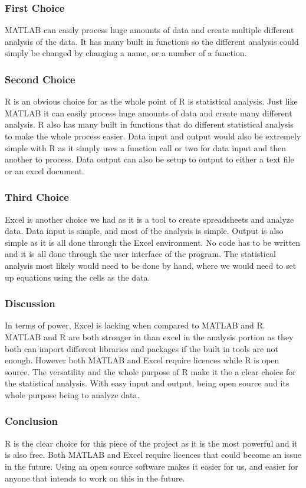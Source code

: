 	\subsubsection*{First Choice}
	MATLAB can easily process huge amounts of data and create multiple different analysis of the data. It has many built in functions so the different analysis could simply be changed by changing a name, or a number of a function. 
	\subsubsection*{Second Choice}
	R is an obvious choice for as the whole point of R is statistical analysis. Just like MATLAB it can easily process huge amounts of data and create many different analysis. R also has many built in functions that do different statistical analysis to make the whole process easier. Data input and output would also be extremely simple with R as it simply uses a function call or two for data input and then another to process. Data output can also be setup to output to either a text file or an excel document.
	\subsubsection*{Third Choice}
	Excel is another choice we had as it is a tool to create spreadsheets and analyze data. Data input is simple, and most of the analysis is simple. Output is also simple as it is all done through the Excel environment. No code has to be written and it is all done through the user interface of the program. The statistical analysis most likely would need to be done by hand, where we would need to set up equations using the cells as the data.
	\subsubsection*{Discussion}
	In terms of power, Excel is lacking when compared to MATLAB and R. MATLAB and R are both stronger in than excel in the analysis portion as they both can import different libraries and packages if the built in tools are not enough. However both MATLAB and Excel require licences while R is open source. The versatility and the whole purpose of R make it the a clear choice for the statistical analysis. With easy input and output, being open source and its whole purpose being to analyze data.
	\subsubsection*{Conclusion}	
	R is the clear choice for this piece of the project as it is the most powerful and it is also free. Both MATLAB and Excel require licences that could become an issue in the future. Using an open source software makes it easier for us, and easier for anyone that intends to work on this in the future.
